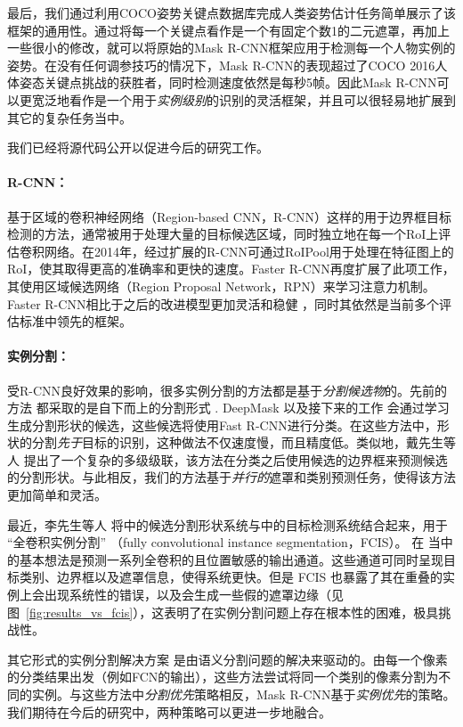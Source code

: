 最后，我们通过利用COCO姿势关键点数据库完成人类姿势估计任务简单展示了该框架的通用性。通过将每一个关键点看作是一个有固定个数1的二元遮罩，再加上一些很小的修改，就可以将原始的Mask R-CNN框架应用于检测每一个人物实例的姿势。在没有任何调参技巧的情况下，Mask R-CNN的表现超过了COCO 2016人体姿态关键点挑战的获胜者，同时检测速度依然是每秒5帧。因此Mask R-CNN可以更宽泛地看作是一个用于\emph{实例级别}的识别的灵活框架，并且可以很轻易地扩展到其它的复杂任务当中。

我们已经将源代码公开以促进今后的研究工作。


\paragraph{R-CNN：} 基于区域的卷积神经网络（Region-based CNN，R-CNN）这样的用于边界框目标检测的方法，通常被用于处理大量的目标候选区域，同时独立地在每一个RoI上评估卷积网络。在2014年，经过扩展的R-CNN可通过RoIPool用于处理在特征图上的RoI，使其取得更高的准确率和更快的速度。Faster R-CNN再度扩展了此项工作，其使用区域候选网络（Region Proposal Network，RPN）来学习注意力机制。Faster R-CNN相比于之后的改进模型更加灵活和稳健 ，同时其依然是当前多个评估标准中领先的框架。

\paragraph{实例分割：} 受R-CNN良好效果的影响，很多实例分割的方法都是基于\emph{分割候选物}的。先前的方法  都采取的是自下而上的分割形式 . DeepMask  以及接下来的工作  会通过学习生成分割形状的候选，这些候选将使用Fast R-CNN进行分类。在这些方法中，形状的分割\emph{先于}目标的识别，这种做法不仅速度慢，而且精度低。类似地，戴先生等人  提出了一个复杂的多级级联，该方法在分类之后使用候选的边界框来预测候选的分割形状。与此相反，我们的方法基于\emph{并行的}遮罩和类别预测任务，使得该方法更加简单和灵活。

最近，李先生等人  将中的候选分割形状系统与中的目标检测系统结合起来，用于 ``全卷积实例分割'' （fully convolutional instance segmentation，FCIS）。 在  当中的基本想法是预测一系列全卷积的且位置敏感的输出通道。这些通道可同时呈现目标类别、边界框以及遮罩信息，使得系统更快。但是 FCIS 也暴露了其在重叠的实例上会出现系统性的错误，以及会生成一些假的遮罩边缘（见图~\ref{fig:results_vs_fcis}），这表明了在实例分割问题上存在根本性的困难，极具挑战性。

其它形式的实例分割解决方案  是由语义分割问题的解决来驱动的。由每一个像素的分类结果出发（例如FCN的输出），这些方法尝试将同一个类别的像素分割为不同的实例。与这些方法中\emph{分割优先}策略相反，Mask R-CNN基于\emph{实例优先}的策略。我们期待在今后的研究中，两种策略可以更进一步地融合。

